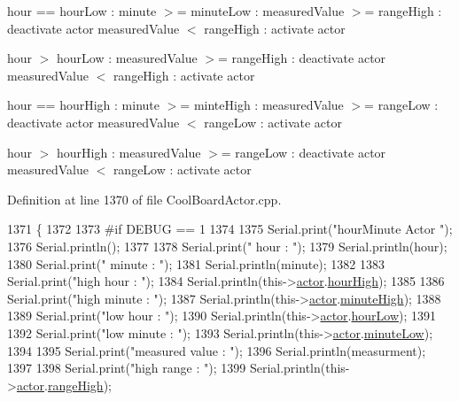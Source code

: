 hour == hour\+Low \+: minute $>$= minute\+Low \+: measured\+Value $>$= range\+High \+: deactivate actor measured\+Value $<$ range\+High \+: activate actor

hour $>$ hour\+Low \+: measured\+Value $>$= range\+High \+: deactivate actor measured\+Value $<$ range\+High \+: activate actor

hour == hour\+High \+: minute $>$= minte\+High \+: measured\+Value $>$= range\+Low \+: deactivate actor measured\+Value $<$ range\+Low \+: activate actor

hour $>$ hour\+High \+: measured\+Value $>$= range\+Low \+: deactivate actor measured\+Value $<$ range\+Low \+: activate actor 

Definition at line 1370 of file Cool\+Board\+Actor.\+cpp.


\begin{DoxyCode}
1371 \{
1372 
1373 \textcolor{preprocessor}{#if DEBUG == 1}
1374     
1375     Serial.print(\textcolor{stringliteral}{"hourMinute Actor  "});
1376     Serial.println();
1377 
1378     Serial.print(\textcolor{stringliteral}{" hour : "});
1379     Serial.println(hour);
1380     Serial.print(\textcolor{stringliteral}{" minute : "});
1381     Serial.println(minute);
1382 
1383     Serial.print(\textcolor{stringliteral}{"high hour : "});
1384     Serial.println(this->\hyperlink{class_cool_board_actor_a8f190db9f7a39fddbcef7f152da970e9}{actor}.\hyperlink{struct_cool_board_actor_1_1state_acd1af3ac2382258a5b05497d814adc01}{hourHigh});
1385 
1386     Serial.print(\textcolor{stringliteral}{"high minute : "});
1387     Serial.println(this->\hyperlink{class_cool_board_actor_a8f190db9f7a39fddbcef7f152da970e9}{actor}.\hyperlink{struct_cool_board_actor_1_1state_a4bff3d61ead74adb60be224764b93006}{minuteHigh});
1388 
1389     Serial.print(\textcolor{stringliteral}{"low hour : "});
1390     Serial.println(this->\hyperlink{class_cool_board_actor_a8f190db9f7a39fddbcef7f152da970e9}{actor}.\hyperlink{struct_cool_board_actor_1_1state_ae7034bf95b36f1392f9de076fa0c8c0f}{hourLow});
1391 
1392     Serial.print(\textcolor{stringliteral}{"low minute : "});
1393     Serial.println(this->\hyperlink{class_cool_board_actor_a8f190db9f7a39fddbcef7f152da970e9}{actor}.\hyperlink{struct_cool_board_actor_1_1state_acbcc2902331fd9d757cd475eb403bdd9}{minuteLow});
1394 
1395     Serial.print(\textcolor{stringliteral}{"measured value : "});
1396     Serial.println(measurment);
1397 
1398     Serial.print(\textcolor{stringliteral}{"high range : "});
1399     Serial.println(this->\hyperlink{class_cool_board_actor_a8f190db9f7a39fddbcef7f152da970e9}{actor}.\hyperlink{struct_cool_board_actor_1_1state_a6e5cd6c5cd44e2decfd8d4df1853f8e3}{rangeHigh});

\end{DoxyCode}
